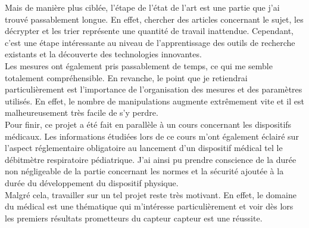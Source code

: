 Mais de manière plus ciblée, l'étape de l'état de l'art est une partie que j'ai trouvé passablement longue. En effet, chercher des articles concernant le sujet, les 
décrypter et les trier représente une quantité de travail inattendue. Cependant, c'est une étape intéressante au niveau de 
l'apprentissage des outils de recherche existants et la découverte des technologies innovantes. \\

Les mesures ont également pris passablement de temps, ce qui me semble totalement compréhensible. En revanche, le point que je retiendrai particulièrement 
est l'importance de l'organisation des mesures et des paramètres utilisés. En effet, le nombre de manipulations augmente extrêmement vite et 
il est malheureusement très facile de s'y perdre. \\

Pour finir, ce projet a été fait en parallèle à un cours concernant les dispositifs médicaux. Les informations étudiées lors de ce cours m'ont également 
éclairé sur l'aspect réglementaire obligatoire au lancement d'un dispositif médical tel le débitmètre respiratoire pédiatrique. J'ai ainsi pu 
prendre conscience de la durée non négligeable de la partie concernant les normes et la sécurité ajoutée à la durée du développement du dispositif 
physique. \\

Malgré cela, travailler sur un tel projet reste très motivant. En effet, le domaine du médical est une thématique qui m'intéresse particulièrement 
et voir dès lors les premiers résultats prometteurs du capteur \gls{capteur} est une réussite. 


\vfil
\hspace{8cm}\makeatletter\@author\makeatother\par
\hspace{8cm}\begin{minipage}{5cm}
    \printsignature
\end{minipage}